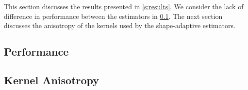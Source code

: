 This section discusses the results presented in \cref{s:results}. We consider the lack of difference in performance between the estimators in \cref{s:discussion:performance}. The next section discusses the anisotropy of the kernels used by the shape-adaptive estimators. 

\subsection{Performance}
\label{s:discussion:performance}


\subsection{Kernel Anisotropy}
\label{s:discussion:anisotropy}
